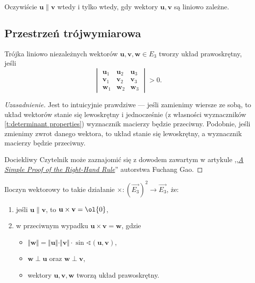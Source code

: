 Oczywiście $\mathbf{u} \parallel \mathbf{v}$ wtedy i tylko wtedy, gdy wektory $\mathbf{u}, \mathbf{v}$ są liniowo zależne.

\subsection{Przestrzeń trójwymiarowa}
\begin{fact}
    Trójka liniowo niezależnych wektorów $\mathbf{u}, \mathbf{v}, \mathbf{w} \in E_3$ tworzy układ prawoskrętny, jeśli
    \[ \begin{vmatrix}
        \mathbf{u}_1 & \mathbf{u}_2 & \mathbf{u}_3 \\
        \mathbf{v}_1 & \mathbf{v}_2 & \mathbf{v}_3 \\
        \mathbf{w}_1 & \mathbf{w}_2 & \mathbf{w}_3
    \end{vmatrix} > 0. \]
\end{fact}
\begin{proof}[Uzasadnienie]
    Jest to intuicyjnie prawdziwe --- jeśli zamienimy wiersze ze sobą, to układ wektorów stanie się lewoskrętny i jednocześnie (z własności wyznaczników \ref{t:determinant properties}) wyznacznik macierzy będzie przeciwny. Podobnie, jeśli zmienimy zwrot danego wektora, to układ stanie się lewoskrętny, a wyznacznik macierzy będzie przeciwny.

    Dociekliwy Czytelnik może zaznajomić się z dowodem zawartym w artykule ,,\textit{\href{https://sites.math.washington.edu/~marshall/math_136/right-hand-rule.pdf}{A Simple Proof of the Right-Hand Rule}}'' autorstwa Fuchang Gao.
\end{proof}

\begin{definition}
    \label{d:cross product}
    Iloczyn wektorowy to takie działanie $\times : (\overrightarrow{E_3})^2 \to \overrightarrow{E_3}$, że:
    \begin{enumerate}
        \item jeśli $\mathbf{u} \parallel \mathbf{v}$, to $\mathbf{u} \times \mathbf{v} = \ol{0}$,
        \item w przeciwnym wypadku $\mathbf{u} \times \mathbf{v} = \mathbf{w}$, gdzie
            \begin{itemize}
                \item $\Vert\mathbf{w}\Vert = \Vert\mathbf{u}\Vert \cdot \Vert\mathbf{v}\Vert\cdot\sin\sphericalangle(\mathbf{u}, \mathbf{v})$,
                \item $\mathbf{w} \perp \mathbf{u}$ oraz $\mathbf{w} \perp \mathbf{v}$,
                \item wektory $\mathbf{u}, \mathbf{v}, \mathbf{w}$ tworzą układ prawoskrętny.
            \end{itemize}
    \end{enumerate}
\end{definition}

